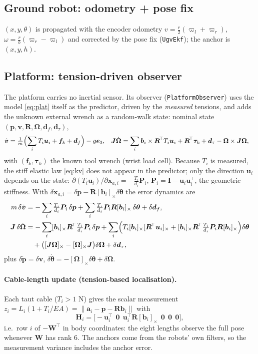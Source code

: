 \documentclass[11pt,a4paper]{article}
\newcommand{\hatm}[1]{[#1]_\times}
\newcommand{\T}{^{\!\top}}
\newcommand{\e}{\bm{e}}
\begin{document}
\subsection{Ground robot: odometry + pose fix}
$(x,y,\theta)$ is propagated with the encoder odometry $v=\tfrac r2(\varpi_l+\varpi_r)$, $\omega=\tfrac rb(\varpi_r-\varpi_l)$ and
corrected by the pose fix (\texttt{UgvEkf}); the anchor is $(x,y,h)$.

\subsection{Platform: tension-driven observer}\label{sec:obs}
The platform carries no inertial sensor. Its observer (\texttt{PlatformObserver}) uses the model
\eqref{eq:plat} itself as the predictor, driven by the \emph{measured} tensions, and adds the unknown external
wrench as a random-walk state: nominal state $(\bm p,\bm v,\bm R,\bm\Omega,\bm d_f,\bm d_\tau)$,
\begin{align}
 \dot{\bm v}&=\tfrac1m\Bigl(\sum_iT_i\bm u_i+\bm f_k+\bm d_f\Bigr)-g\e_3, &
 \bm J\dot{\bm\Omega}&=\sum_i\bm b_i\times\bm R\T T_i\bm u_i+\bm R\T\bm\tau_k+\bm d_\tau-\bm\Omega\times\bm J\bm\Omega,
\end{align}
with $(\bm f_k,\bm\tau_k)$ the known tool wrench (wrist load cell). Because $T_i$ is measured, the stiff elastic
law \eqref{eq:kv} does not appear in the predictor; only the direction $\bm u_i$ depends on the state:
$\partial(T_i\bm u_i)/\partial\bm x_{a,i}=-\tfrac{T_i}{d_i}\bm P_i$, $\bm P_i=\bm I-\bm u_i\bm u_i\T$, the geometric stiffness. With
$\delta\bm x_{a,i}=\delta\bm p-\bm R\hatm{\bm b_i}\delta\bm\theta$ the error dynamics are
\begin{align}
 m\,\delta\dot{\bm v}&=-\sum_i\tfrac{T_i}{d_i}\bm P_i\,\delta\bm p+\sum_i\tfrac{T_i}{d_i}\bm P_i\bm R\hatm{\bm b_i}\,\delta\bm\theta+\delta\bm d_f,\\
 \bm J\,\delta\dot{\bm\Omega}&=-\sum_i\hatm{\bm b_i}\bm R\T\tfrac{T_i}{d_i}\bm P_i\,\delta\bm p
 +\sum_i\Bigl(T_i\hatm{\bm b_i}\hatm{\bm R\T\bm u_i}+\hatm{\bm b_i}\bm R\T\tfrac{T_i}{d_i}\bm P_i\bm R\hatm{\bm b_i}\Bigr)\delta\bm\theta\notag\\
 &\quad+\bigl(\hatm{\bm J\bm\Omega}-\hatm{\bm\Omega}\bm J\bigr)\delta\bm\Omega+\delta\bm d_\tau,
\end{align}
plus $\delta\dot{\bm p}=\delta\bm v$, $\delta\dot{\bm\theta}=-\hatm{\bm\Omega}\delta\bm\theta+\delta\bm\Omega$.

\paragraph{Cable-length update (tension-based localisation).} Each taut cable ($T_i>1$ N) gives the scalar
measurement $z_i=L_i(1+T_i/EA)=\|\bm a_i-\bm p-\bm R\bm b_i\|$ with
\begin{equation}
 \bm H_i=\bigl[-\bm u_i\T\ \ \bm 0\ \ \bm u_i\T\bm R\hatm{\bm b_i}\ \ \bm 0\ \ \bm 0\ \ \bm 0\bigr],
\end{equation}
i.e.\ row $i$ of $-\bm W\T$ in body coordinates: the eight lengths observe the full pose whenever $\bm W$ has rank
6. The anchors come from the robots' own filters, so the measurement variance includes the anchor error.
\end{document}
